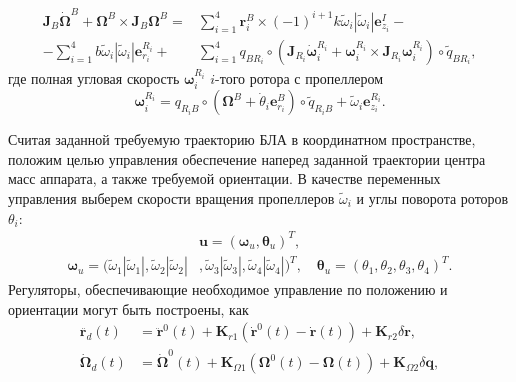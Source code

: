 \begin{equation} \label{eq:m_final_rotational_motion}
\begin{aligned}
\bm{J}_B\dot{\bm{\Omega}}^B + \bm{\Omega}^B \times \bm{J}_B{\bm{\Omega}^B} =
&\sum_{i=1}^{4} {\bm{r}^B_i \times
	(-1)^{i+1} k \tilde \omega_i |\tilde \omega_i| \bm{e}^I_{z_i}} - \\
-\sum_{i=1}^{4} {b \tilde \omega_i |\tilde \omega_i| \bm e^{R_i}_{r_i}} +
&\sum_{i=1}^{4} q_{ B {R_i}} \circ (\bm{J}_{R_i}\dot{\bm{\omega}}^{R_i}_i + \bm{\omega}^{R_i}_i \times \bm{J}_{R_i}{\bm{\omega}^{R_i}_i}) \circ \tilde q_{ B {R_i}}
,
\end{aligned}
\end{equation}
где полная угловая скорость $\bm{\omega}^{R_i}_i$ $i$-того ротора с пропеллером
\begin{equation} \label{eq:m_prop_ang_vel}
\bm{\omega}^{R_i}_i =
q_{{R_i} B} \circ (\bm{\Omega}^B + \dot {\theta}_i \bm e^B_{r_i}) \circ \tilde {q}_{{R_i}B} +
\tilde \omega_i \bm{e}^{R_i}_{z_i}
.
\end{equation}

Считая заданной требуемую траекторию БЛА в координатном пространстве, положим целью управления обеспечение наперед заданной траектории центра масс аппарата, а также требуемой ориентации. В качестве переменных управления выберем скорости вращения пропеллеров ${\tilde \omega}_i$ и углы поворота роторов ${\theta}_i$:
\begin{equation} \label{eq:m_ctrl_out}
\begin{aligned}
&\bm{u} = (\bm \omega_u, \bm \theta_u)^T,
\\
\bm \omega_u =
(\tilde\omega_1 |\tilde\omega_1|,
\tilde\omega_2 |\tilde\omega_2|&,
\tilde\omega_3 |\tilde\omega_3|,
\tilde\omega_4 |\tilde\omega_4|)^T,
\quad
\bm \theta_u = (\theta_1, \theta_2 , \theta_3 , \theta_4 )^T.
\end{aligned}
\end{equation}
Регуляторы, обеспечивающие необходимое управление по положению и ориентации могут быть построены, как
\begin{equation} \label{eq:m_reg}
\begin{aligned}
\ddot{\bm{r}_d}(t)&=
\ddot{\bm{r}}^0(t)+\bm{K}_{r1}(\dot{\bm{r}}^0(t) - \dot{\bm{r}}(t))+\bm{K}_{r2}\delta \bm r,\\
\dot{\bm{\Omega}}_d(t)&=
\dot{\bm{\Omega}}^0(t)+\bm{K}_{\Omega1}(\bm{\Omega}^0(t)-\bm{\Omega}(t))+\bm{K}_{\Omega2}\delta\bm{q},
\end{aligned}
\end{equation}

